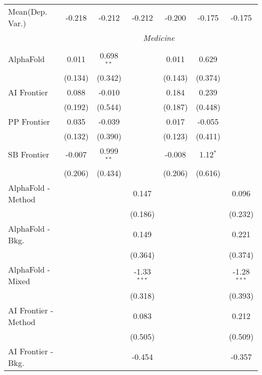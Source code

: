 \begin{tabular}{lcccccc}
Mean(Dep. Var.) & -0.218 & -0.212 & -0.212 & -0.200 & -0.175 & -0.175 \\
 & \multicolumn{6}{c}{\textit{Medicine}} \\ \\
   AlphaFold            & 0.011   & 0.698$^{**}$ &               & 0.011   & 0.629      &   \\   
                        & (0.134) & (0.342)      &               & (0.143) & (0.374)    &   \\   
   AI Frontier          & 0.088   & -0.010       &               & 0.184   & 0.239      &   \\   
                        & (0.192) & (0.544)      &               & (0.187) & (0.448)    &   \\   
   PP Frontier          & 0.035   & -0.039       &               & 0.017   & -0.055     &   \\   
                        & (0.132) & (0.390)      &               & (0.123) & (0.411)    &   \\   
   SB Frontier          & -0.007  & 0.999$^{**}$ &               & -0.008  & 1.12$^{*}$ &   \\   
                        & (0.206) & (0.434)      &               & (0.206) & (0.616)    &   \\   
   AlphaFold - Method   &         &              & 0.147         &         &            & 0.096\\   
                        &         &              & (0.186)       &         &            & (0.232)\\   
   AlphaFold - Bkg.     &         &              & 0.149         &         &            & 0.221\\   
                        &         &              & (0.364)       &         &            & (0.374)\\   
   AlphaFold - Mixed    &         &              & -1.33$^{***}$ &         &            & -1.28$^{***}$\\   
                        &         &              & (0.318)       &         &            & (0.393)\\   
   AI Frontier - Method &         &              & 0.083         &         &            & 0.212\\   
                        &         &              & (0.505)       &         &            & (0.509)\\   
   AI Frontier - Bkg.   &         &              & -0.454        &         &            & -0.357\\   

\end{tabular}

